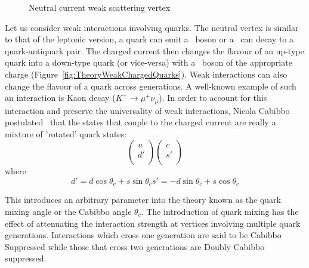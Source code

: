 \begin{figure}
  \centering
  
  \caption{Neutral current weak scattering vertex} \label{fig:TheoryMuonDecay}
\end{figure}

Let us consider weak interactions involving quarks. The neutral vertex is similar to that of the leptonic version, a quark can emit a \Z\ boson or a \Z\ can decay to a quark-antiquark pair. The charged current then changes the flavour of an up-type quark into a down-type quark (or vice-versa) with a \W\ boson of the appropriate charge (Figure~\ref{fig:TheoryWeakChargedQuarks}). Weak interactions can also change the flavour of a quark across generations. A well-known example of such an interaction is Kaon decay ($K^{+}\rightarrow \mu^{+}\nu_{\mu}$). In order to account for this interaction and preserve the universality of weak interactions, Nicola Cabibbo postulated~\cite{Theory:CKMNicola} that the states that couple to the charged current are really a mixture of 'rotated' quark states:
%
\begin{equation}
\begin{pmatrix}
  u \\
  d' \\
\end{pmatrix}
\begin{pmatrix}
  c \\
  s' \\
\end{pmatrix}
\end{equation}
%
where
%
\begin{subequations}
  \begin{equation}
  \label{eq:TheoryWeakQuarkMixingEq1}
  d'=d\cos\theta_{c} + s\sin\theta_{c}
  \end{equation}
  \begin{equation}
  \label{eq:TheoryWeakQuarkMixingEq2}
  s'=-d\sin\theta_{c} + s\cos\theta_{c}
  \end{equation}
\end{subequations}

This introduces an arbitrary parameter into the theory known as the quark mixing angle or the Cabibbo angle $\theta_{c}$. The introduction of quark mixing has the effect of attenuating the interaction strength at vertices involving multiple quark generations. Interactions which cross one generation are said to be Cabibbo Suppressed while those that cross two generations are Doubly Cabibbo suppressed.

